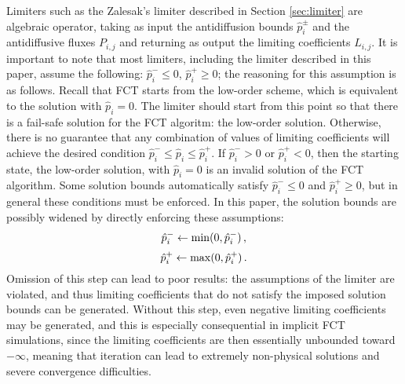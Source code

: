Limiters such as the Zalesak's limiter described in Section \ref{sec:limiter} are algebraic
operator, taking as input the antidiffusion bounds
$\hat{p}_i^\pm$ and the antidiffusive fluxes $P_{i,j}$ and returning as output the
limiting coefficients $L_{i,j}$. It is important to note that most limiters,
including the limiter described in this paper, assume the following:
$\hat{p}_i^-\leq 0$, $\hat{p}_i^+\geq 0$; the reasoning for this assumption
is as follows. Recall that FCT starts from the
low-order scheme, which is equivalent to the solution with $\hat{p}_i=0$.
The limiter should start from this point so that there is a fail-safe solution
for the FCT algoritm: the low-order solution. Otherwise, there is no guarantee
that any combination of values of limiting coefficients will achieve
the desired condition $\hat{p}_i^-\leq \hat{p}_i\leq \hat{p}_i^+$. If
$\hat{p}_i^- > 0$ or $\hat{p}_i^+ < 0$, then the starting state, the low-order
solution, with $\hat{p}_i=0$ is an invalid solution of the FCT algorithm.
Some solution bounds automatically satisfy $\hat{p}_i^-\leq 0$ and $\hat{p}_i^+\geq 0$,
but in general these conditions must be enforced. In this paper, the solution
bounds are possibly widened by directly enforcing these assumptions:
\begin{equation}
  \hat{p}_i^- \gets \min(0,\hat{p}_i^-) \,,
\end{equation}
\begin{equation}
  \hat{p}_i^+ \gets \max(0,\hat{p}_i^+) \,.
\end{equation}
Omission of this step can lead to poor results: the assumptions of the
limiter are violated, and thus limiting coefficients that do not satisfy the
imposed solution bounds can be generated. Without this step, even negative limiting coefficients
may be generated, and this is especially consequential in implicit FCT
simulations, since the limiting coefficients are then essentially unbounded
toward $-\infty$, meaning that iteration can lead to extremely non-physical solutions
and severe convergence difficulties.


